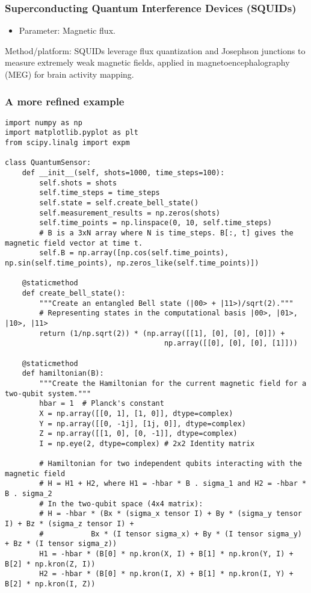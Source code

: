 \documentclass{beamer}
\begin{document}
\begin{frame}
\frametitle{Superconducting Quantum Interference Devices (SQUIDs)}

\begin{itemize}
\item Parameter: Magnetic flux.  
\end{itemize}

\noindent
\begin{block}{}
Method/platform: SQUIDs leverage flux quantization and Josephson junctions to measure extremely weak magnetic fields, applied in magnetoencephalography (MEG) for brain activity mapping.
\end{block}
\end{frame}

\begin{frame}
\frametitle{A more refined example}

\begin{verbatim}
import numpy as np
import matplotlib.pyplot as plt
from scipy.linalg import expm

class QuantumSensor:
    def __init__(self, shots=1000, time_steps=100):
        self.shots = shots
        self.time_steps = time_steps
        self.state = self.create_bell_state()
        self.measurement_results = np.zeros(shots)
        self.time_points = np.linspace(0, 10, self.time_steps)
        # B is a 3xN array where N is time_steps. B[:, t] gives the magnetic field vector at time t.
        self.B = np.array([np.cos(self.time_points), np.sin(self.time_points), np.zeros_like(self.time_points)])

    @staticmethod
    def create_bell_state():
        """Create an entangled Bell state (|00> + |11>)/sqrt(2)."""
        # Representing states in the computational basis |00>, |01>, |10>, |11>
        return (1/np.sqrt(2)) * (np.array([[1], [0], [0], [0]]) +
                                     np.array([[0], [0], [0], [1]]))

    @staticmethod
    def hamiltonian(B):
        """Create the Hamiltonian for the current magnetic field for a two-qubit system."""
        hbar = 1  # Planck's constant
        X = np.array([[0, 1], [1, 0]], dtype=complex)
        Y = np.array([[0, -1j], [1j, 0]], dtype=complex)
        Z = np.array([[1, 0], [0, -1]], dtype=complex)
        I = np.eye(2, dtype=complex) # 2x2 Identity matrix

        # Hamiltonian for two independent qubits interacting with the magnetic field
        # H = H1 + H2, where H1 = -hbar * B . sigma_1 and H2 = -hbar * B . sigma_2
        # In the two-qubit space (4x4 matrix):
        # H = -hbar * (Bx * (sigma_x tensor I) + By * (sigma_y tensor I) + Bz * (sigma_z tensor I) +
        #           Bx * (I tensor sigma_x) + By * (I tensor sigma_y) + Bz * (I tensor sigma_z))
        H1 = -hbar * (B[0] * np.kron(X, I) + B[1] * np.kron(Y, I) + B[2] * np.kron(Z, I))
        H2 = -hbar * (B[0] * np.kron(I, X) + B[1] * np.kron(I, Y) + B[2] * np.kron(I, Z))


\end{verbatim}
\end{frame}
\end{document}
